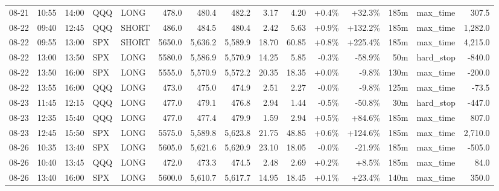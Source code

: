 \documentclass[11pt,a4paper,twoside]{article}
\begin{document}
\begin{landscape}
\begin{center}
\begin{longtable}{>{\color{txtmain}}l l l l l r r r r r r r r >{\color{txtmain}}l r}
08-21 & 10:55 & 14:00 & QQQ & LONG & 478.0 & 480.4 & 482.2 & 3.17 & 4.20 & \textcolor{wingreen}{+0.4\%} & \textcolor{wingreen}{+32.3\%} & 185m & max\_time & \textcolor{wingreen}{307.5} \\
08-22 & 09:40 & 12:45 & QQQ & SHORT & 486.0 & 484.5 & 480.4 & 2.42 & 5.63 & \textcolor{wingreen}{+0.9\%} & \textcolor{wingreen}{+132.2\%} & 185m & max\_time & \textcolor{wingreen}{1,282.0} \\
08-22 & 09:55 & 13:00 & SPX & SHORT & 5650.0 & 5,636.2 & 5,589.9 & 18.70 & 60.85 & \textcolor{wingreen}{+0.8\%} & \textcolor{wingreen}{+225.4\%} & 185m & max\_time & \textcolor{wingreen}{4,215.0} \\
08-22 & 13:00 & 13:50 & SPX & LONG & 5580.0 & 5,586.9 & 5,570.9 & 14.25 & 5.85 & \textcolor{lossred}{-0.3\%} & \textcolor{lossred}{-58.9\%} & 50m & hard\_stop & \textcolor{lossred}{-840.0} \\
08-22 & 13:50 & 16:00 & SPX & LONG & 5555.0 & 5,570.9 & 5,572.2 & 20.35 & 18.35 & \textcolor{wingreen}{+0.0\%} & \textcolor{lossred}{-9.8\%} & 130m & max\_time & \textcolor{lossred}{-200.0} \\
08-22 & 13:55 & 16:00 & QQQ & LONG & 473.0 & 475.0 & 474.9 & 2.51 & 2.27 & \textcolor{lossred}{-0.0\%} & \textcolor{lossred}{-9.8\%} & 125m & max\_time & \textcolor{lossred}{-73.5} \\
08-23 & 11:45 & 12:15 & QQQ & LONG & 477.0 & 479.1 & 476.8 & 2.94 & 1.44 & \textcolor{lossred}{-0.5\%} & \textcolor{lossred}{-50.8\%} & 30m & hard\_stop & \textcolor{lossred}{-447.0} \\
08-23 & 12:35 & 15:40 & QQQ & LONG & 477.0 & 477.4 & 479.9 & 1.59 & 2.94 & \textcolor{wingreen}{+0.5\%} & \textcolor{wingreen}{+84.6\%} & 185m & max\_time & \textcolor{wingreen}{807.0} \\
08-23 & 12:45 & 15:50 & SPX & LONG & 5575.0 & 5,589.8 & 5,623.8 & 21.75 & 48.85 & \textcolor{wingreen}{+0.6\%} & \textcolor{wingreen}{+124.6\%} & 185m & max\_time & \textcolor{wingreen}{2,710.0} \\
08-26 & 10:35 & 13:40 & SPX & LONG & 5605.0 & 5,621.6 & 5,620.9 & 23.10 & 18.05 & \textcolor{lossred}{-0.0\%} & \textcolor{lossred}{-21.9\%} & 185m & max\_time & \textcolor{lossred}{-505.0} \\
08-26 & 10:40 & 13:45 & QQQ & LONG & 472.0 & 473.3 & 474.5 & 2.48 & 2.69 & \textcolor{wingreen}{+0.2\%} & \textcolor{wingreen}{+8.5\%} & 185m & max\_time & \textcolor{wingreen}{84.0} \\
08-26 & 13:40 & 16:00 & SPX & LONG & 5600.0 & 5,610.7 & 5,617.7 & 14.95 & 18.45 & \textcolor{wingreen}{+0.1\%} & \textcolor{wingreen}{+23.4\%} & 140m & max\_time & \textcolor{wingreen}{350.0} \\

\end{longtable}
\end{center}
\end{landscape}
\end{document}
